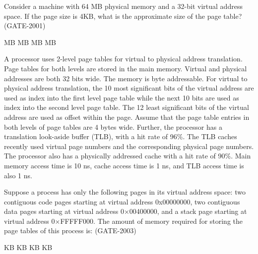 
\begin{questyle}

  \question  Consider a machine with 64 MB physical memory and a 32-bit virtual address space. If the page size is 4KB, what
              is the approximate size of the page table?(GATE-2001)

  \begin{choices}
     MB
     MB
     MB
     MB
  \end{choices}

\end{questyle}


\begin{questyle}

  \question  A processor uses 2-level page tables for virtual to physical address translation. Page tables for
             both levels are stored in the main memory. Virtual and physical addresses are both 32 bits wide.
             The memory is byte addressable. For virtual to physical address translation, the 10 most significant
             bits of the virtual address are used as index into the first level page table while the next 10 bits
             are used as index into the second level page table. The 12 least significant bits of the virtual
             address are used as offset within the page. Assume that the page table entries in both levels of
             page tables are 4 bytes wide. Further, the processor has a translation look-aside buffer (TLB), with a
             hit rate of 96\%. The TLB caches recently used virtual page numbers and the corresponding physical
             page numbers. The processor also has a physically addressed cache with a hit rate of 90\%.
             Main memory access time is 10 ns, cache access time is 1 ns, and TLB access time is also 1 ns.

             Suppose a process has only the following pages in its virtual address space: two contiguous code
             pages starting at virtual address 0x00000000, two contiguous data pages starting at virtual
             address 0×00400000, and a stack page starting at virtual address 0×FFFFF000. The amount of memory
             required for storing the page tables of this process is: (GATE-2003)

            \begin{choices}
               KB
               KB
               KB
               KB
            \end{choices}

\end{questyle}


